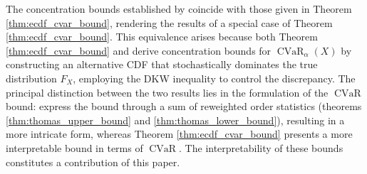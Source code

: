 \documentclass[letterpaper]{article} %
\newenvironment{proof}{\noindent\textit{Proof.}}{\hfill$\square$}
\newcommand{\KP}[1]{\textcolor{red}{#1}}
\begin{document}



The concentration bounds established by \cite{pmlr-v97-thomas19a} coincide with those given in Theorem \ref{thm:ecdf_cvar_bound}, rendering the results of \cite{pmlr-v97-thomas19a} a special case of Theorem \ref{thm:ecdf_cvar_bound}. This equivalence arises because both Theorem \ref{thm:ecdf_cvar_bound} and \cite{pmlr-v97-thomas19a} derive concentration bounds for $\operatorname{CVaR}_\alpha(X)$ by constructing an alternative CDF that stochastically dominates the true distribution $F_X$, employing the DKW inequality to control the discrepancy. The principal distinction between the two results lies in the formulation of the $\operatorname{CVaR}$ bound: \cite{pmlr-v97-thomas19a} express the bound through a sum of reweighted order statistics (theorems \ref{thm:thomas_upper_bound} and \ref{thm:thomas_lower_bound}), resulting in a more intricate form, whereas Theorem \ref{thm:ecdf_cvar_bound} presents a more interpretable bound in terms of $\operatorname{CVaR}$. The interpretability of these bounds constitutes a contribution of this paper.
\end{document}
